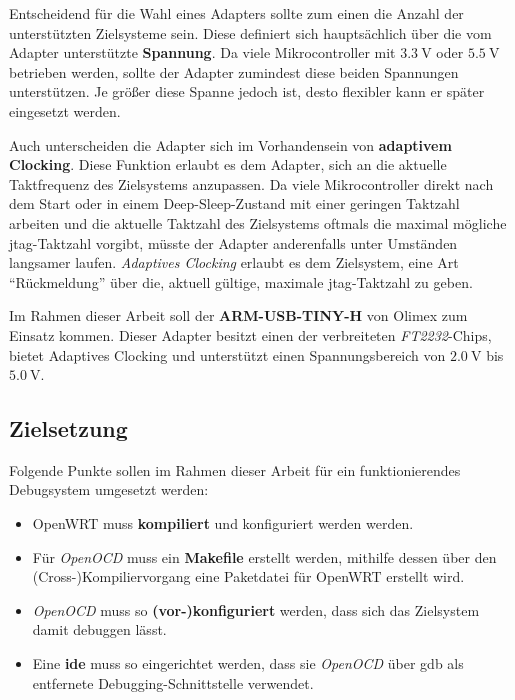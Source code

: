 Entscheidend für die Wahl eines Adapters sollte zum einen die Anzahl der
unterstützten Zielsysteme sein. Diese definiert sich hauptsächlich über die
vom Adapter unterstützte \textbf{Spannung}. Da viele Mikrocontroller mit
$\SI{3.3}{\volt}$ oder $\SI{5.5}{\volt}$ betrieben werden, sollte der Adapter
zumindest diese beiden Spannungen unterstützen. Je größer diese Spanne jedoch ist, desto flexibler kann
er später eingesetzt werden.

Auch unterscheiden die Adapter sich im Vorhandensein von \textbf{adaptivem
Clocking}. Diese Funktion erlaubt es dem Adapter, sich an die aktuelle
Taktfrequenz des Zielsystems anzupassen. Da viele Mikrocontroller direkt nach
dem Start oder in einem Deep-Sleep-Zustand mit einer geringen Taktzahl arbeiten
und die aktuelle Taktzahl des Zielsystems oftmals die maximal mögliche
\gls{jtag}-Taktzahl vorgibt, müsste der Adapter anderenfalls unter Umständen langsamer
laufen. \emph{Adaptives Clocking} erlaubt es dem Zielsystem, eine Art
"`Rückmeldung"' über die, aktuell gültige, maximale \gls{jtag}-Taktzahl zu geben.

Im Rahmen dieser Arbeit soll der \textbf{ARM-USB-TINY-H} von Olimex zum Einsatz
kommen.
Dieser Adapter besitzt einen der verbreiteten \emph{FT2232}-Chips, bietet
Adaptives Clocking und unterstützt einen Spannungsbereich von $\SI{2.0}{\volt}$
bis $\SI{5.0}{\volt}$.

\subsection{Zielsetzung}
Folgende Punkte sollen im Rahmen dieser Arbeit für ein funktionierendes
Debugsystem umgesetzt werden:
\begin{itemize}
  \item OpenWRT muss \textbf{kompiliert} und konfiguriert werden werden.
  \item Für \emph{OpenOCD} muss ein \textbf{Makefile} erstellt werden, mithilfe
  dessen über den \\(Cross-)Kompiliervorgang eine Paketdatei für
  OpenWRT erstellt wird.
  \item \emph{OpenOCD} muss so \textbf{(vor-)konfiguriert} werden, dass sich das
  Zielsystem damit debuggen lässt.
  \item Eine \textbf{\gls{ide}} muss so eingerichtet werden, dass sie \emph{OpenOCD}
  über \gls{gdb} als entfernete Debugging-Schnittstelle verwendet.
\end{itemize}
